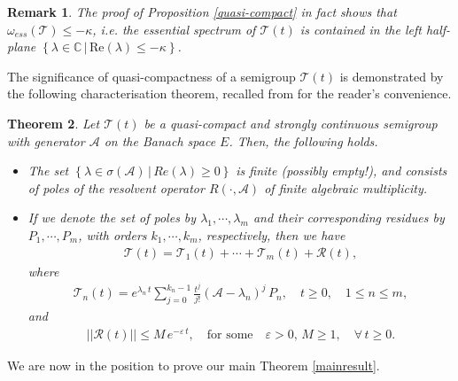 \documentclass[12pt,a4paper]{amsart}
\newtheorem{theorem}{Theorem}[section]
\newtheorem{remark}[theorem]{Remark}
\begin{document}
\begin{remark}
\label{rem:kappa}
The proof of Proposition \ref{quasi-compact} in fact shows that $\omega_{ess}(\mathcal{T})\le -\kappa$, i.e. the essential spectrum of $\mathcal{T}(t)$ is contained in the left half-plane $\left\{\lambda\in\mathbb{C}\,|\,\text{Re}(\lambda)\le -\kappa\right\}$.
\end{remark}

\noindent The significance of quasi-compactness of a semigroup $\mathcal{T}(t)$ is demonstrated by the following cha\-rac\-te\-ri\-sation theorem, recalled from \cite{EngelNagel} for the reader's convenience.
\begin{theorem}\cite[Ch.V, Theorem 3.7]{EngelNagel}\label{quasi-compact-char}
Let $\mathcal{T}(t)$ be a quasi-compact and strongly con\-ti\-nuous semigroup with generator $\mathcal{A}$ on the Banach space $E$. Then, the following holds.
\begin{itemize}
\item[(i)] The set $\left\{\lambda\in\sigma(\mathcal{A})\,|\, Re(\lambda)\ge 0\right\}$ is finite (possibly empty!), and consists of poles of the resolvent operator $R(\cdot, \mathcal{A})$ of finite algebraic multiplicity.
\item[(ii)] If we denote the set of poles by $\lambda_1,\cdots,\lambda_m$ and their corresponding residues by $P_1,\cdots,P_m$, with orders $k_1,\cdots,k_m$, respectively, then we have
\begin{align*}
\mathcal{T}(t)=\mathcal{T}_1(t)+\cdots+\mathcal{T}_m(t)+\mathcal{R}(t),
\end{align*}
where
\begin{align*}
\mathcal{T}_n(t)=e^{\lambda_n\,t}\displaystyle\sum_{j=0}^{k_n-1}\frac{t^j}{j!}(\mathcal{A}-\lambda_n)^j\,P_n,\quad t\ge 0,\quad 1\le n\le m,
\end{align*}
and
\begin{align*}
||\mathcal{R}(t)||\le M\,e^{-\varepsilon\,t},\quad \text{for some} \quad \varepsilon>0,\,M\ge 1,\quad \forall\,t\ge 0.
\end{align*}
\end{itemize}
\end{theorem} 
\noindent We are now in the position to prove our main Theorem \ref{mainresult}.
\end{document}
